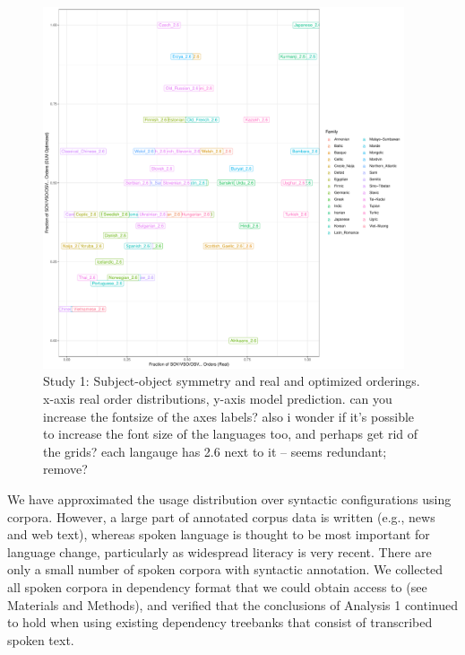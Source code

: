 \documentclass[11pt,a4paper]{article}
\newcommand\comment[1]{{\color{red}#1}}
\begin{document}
\begin{figure}
    \centering
    \includegraphics[width=0.95\textwidth]{figures/fracion-optimized_DLM_2.6.pdf}
    \caption{Study 1: Subject-object symmetry and real and optimized orderings. x-axis real order distributions, y-axis model prediction. \comment{can you increase the fontsize of the axes labels? also i wonder if it's possible to increase the font size of the languages too, and perhaps get rid of the grids? each langauge has 2.6 next to it -- seems redundant; remove?}}
    \label{fig:study1}
\end{figure}





We have approximated the usage distribution over syntactic configurations using corpora.
However, a large part of annotated corpus data is written (e.g., news and web text), whereas spoken language is thought to be most important for language change, particularly as widespread literacy is very recent.
There are only a small number of spoken corpora with syntactic annotation.
We collected all spoken corpora in dependency format that we could obtain access to (see Materials and Methods), and verified that the conclusions of Analysis 1 continued to hold when using existing dependency treebanks that consist of transcribed spoken text.
\end{document}
